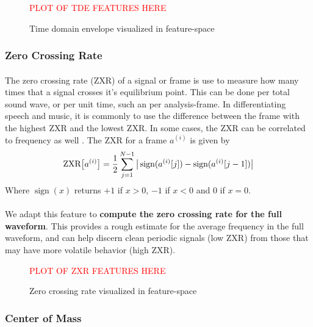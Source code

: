 \documentclass[12pt,letterpaper]{article}
\DeclareMathOperator{\sign}{\text{sign}}
\begin{document}
\begin{figure}[H]
\label{fig-FeatureTDE}
\begin{center}
\textcolor{red}{PLOT OF TDE FEATURES HERE}
\end{center}
\caption{Time domain envelope visualized in feature-space}
\end{figure}

\subsubsection{Zero Crossing Rate}

\paragraph*{}The zero crossing rate (ZXR) of a signal or frame is use to measure how many times that a signal crosses it's equilibrium point. This can be done per total sound wave, or per unit time, such an per analysis-frame. In differentiating speech and music, it is commonly to use the difference between the frame with the highest ZXR and the lowest ZXR. In some cases, the ZXR can be correlated to frequency as well \cite{Kahn,Zhang}. The ZXR for a frame $a^{(i)}$ is given by \cite{Virtanen,Liu}
\begin{equation}
\label{eqn-ZXR}
\text{ZXR}\big[ a^{(i)} \big] = \frac{1}{2} \sum_{j=1}^{N-1} \big{|} \sign(a^{(i)}[j]) - \sign(a^{(i)}[j-1]) \big{|} 
\end{equation}
Where $\sign(x)$ returns $+1$ if $x > 0$, $-1$ if $x < 0$ and $0$ if $x = 0$.

\paragraph*{}We adapt this feature to \textbf{compute the zero crossing rate for the full waveform}. This provides a rough estimate for the average frequency in the full waveform, and can help discern clean periodic signals (low ZXR) from those that may have more volatile behavior (high ZXR)\cite{Virtanen}.

\begin{figure}[H]
\label{fig-FeatureZXR}
\begin{center}
\textcolor{red}{PLOT OF ZXR FEATURES HERE}
\end{center}
\caption{Zero crossing rate visualized in feature-space}
\end{figure}

\subsubsection{Center of Mass}
\end{document}
